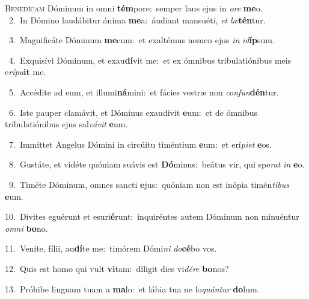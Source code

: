 \lettrine{\initial\textcolor{\initialcolor}{B}}{enedícam} Dóminum in omni \textbf{tém}\-pore:~\star semper laus ejus in \textit{o}\-\textit{re} \textbf{me}\-o.\\
{\numbfont\textcolor{\numbcolor}{~2.}}~In Dómino laudábitur ánima \textbf{me}\-a:~\star áudiant mansuéti, \textit{et} \textit{læ}\-\textbf{tén}tur.\par
{\numbfont\textcolor{\numbcolor}{~3.}}~Magnificáte Dóminum \textbf{me}\-cum:~\star et exaltémus nomen ejus \textit{in} \textit{id}\-\textbf{íp}sum.\par
{\numbfont\textcolor{\numbcolor}{~4.}}~Exquisívi Dóminum, et exau\-\textbf{dí}\-vit me:~\star et ex ómnibus tribulatiónibus meis e\-\textit{rí}\-\textit{pu}\textbf{it} me.\par
{\numbfont\textcolor{\numbcolor}{~5.}}~Accédite ad eum, et illumi\-\textbf{ná}\-mini:~\star et fácies vestræ non \textit{con}\-\textit{fun}\textbf{dén}tur.\par
{\numbfont\textcolor{\numbcolor}{~6.}}~Iste pauper clamávit, et Dóminus exaudívit \textbf{e}\-um:~\star et de ómnibus tribulatiónibus ejus sal\-\textit{vá}\-\textit{vit} \textbf{e}\-um.\par
{\numbfont\textcolor{\numbcolor}{~7.}}~Immíttet Angelus Dómini in circúitu timéntium \textbf{e}\-um:~\star et erí\-\textit{pi}\-\textit{et} \textbf{e}\-os.\par
{\numbfont\textcolor{\numbcolor}{~8.}}~Gustáte, et vidéte quóniam suávis est \textbf{Dó}\-minus:~\star beátus vir, qui spe\textit{rat} \textit{in} \textbf{e}\-o.\par
{\numbfont\textcolor{\numbcolor}{~9.}}~Timéte Dóminum, omnes sancti \textbf{e}\-jus:~\star quóniam non est inópia timén\-\textit{ti}\-\textit{bus} \textbf{e}\-um.\par
{\numbfont\textcolor{\numbcolor}{10.}}~Dívites eguérunt et esuri\-\textbf{é}\-runt:~\star inquiréntes autem Dóminum non minuéntur \textit{om}\-\textit{ni} \textbf{bo}\-no.\par
{\numbfont\textcolor{\numbcolor}{11.}}~Veníte, fílii, au\-\textbf{dí}\-te me:~\star timórem Dómi\textit{ni} \textit{do}\-\textbf{cé}bo vos.\par
{\numbfont\textcolor{\numbcolor}{12.}}~Quis est homo qui vult \textbf{vi}\-tam:~\star díligit dies vi\-\textit{dé}\-\textit{re} \textbf{bo}\-nos?\par
{\numbfont\textcolor{\numbcolor}{13.}}~Próhibe linguam tuam a \textbf{ma}\-lo:~\star et lábia tua ne lo\-\textit{quán}\-\textit{tur} \textbf{do}\-lum.\par
